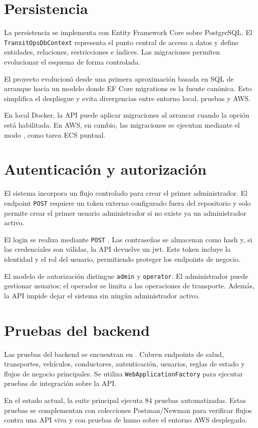 \section{Persistencia}
\label{sec:persistencia}

La persistencia se implementa con Entity Framework Core sobre PostgreSQL. El \texttt{TransitOpsDbContext} representa el punto central de acceso a datos y define entidades, relaciones, restricciones e índices. Las migraciones permiten evolucionar el esquema de forma controlada.

El proyecto evolucionó desde una primera aproximación basada en SQL de arranque hacia un modelo donde EF Core migrations es la fuente canónica. Esto simplifica el despliegue y evita divergencias entre entorno local, pruebas y AWS.

En local Docker, la API puede aplicar migraciones al arrancar cuando la opción  está habilitada. En AWS, en cambio, las migraciones se ejecutan mediante el modo , como tarea ECS puntual.

\section{Autenticación y autorización}
\label{sec:autenticacion-autorizacion}

El sistema incorpora un flujo controlado para crear el primer administrador. El endpoint \texttt{POST}  requiere un token externo configurado fuera del repositorio y solo permite crear el primer usuario administrador si no existe ya un administrador activo.

El login se realiza mediante \texttt{POST} . Las contraseñas se almacenan como hash y, si las credenciales son válidas, la API devuelve un \acrshort{jwt}. Este token incluye la identidad y el rol del usuario, permitiendo proteger los endpoints de negocio.

El modelo de autorización distingue \texttt{admin} y \texttt{operator}. El administrador puede gestionar usuarios; el operador se limita a las operaciones de transporte. Además, la API impide dejar el sistema sin ningún administrador activo.

\section{Pruebas del backend}
\label{sec:pruebas-backend}

Las pruebas del backend se encuentran en . Cubren endpoints de salud, transportes, vehículos, conductores, autenticación, usuarios, reglas de estado y flujos de negocio principales. Se utiliza \texttt{WebApplicationFactory} para ejecutar pruebas de integración sobre la API.

En el estado actual, la suite principal ejecuta 84 pruebas automatizadas. Estas pruebas se complementan con colecciones Postman/Newman para verificar flujos contra una API viva y con pruebas de humo sobre el entorno AWS desplegado.
